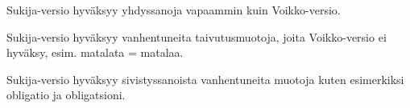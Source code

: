 \documentclass[12pt]{article}
\begin{document}
Sukija-versio hyväksyy yhdyssanoja vapaammin kuin Voikko-versio.

Sukija-versio hyväksyy vanhentuneita taivutusmuotoja, joita
Voikko-versio ei hyväksy, esim. matalata = matalaa.

Sukija-versio hyväksyy sivistyssanoista vanhentuneita muotoja kuten
esimerkiksi obligatio ja obligatsioni.



\end{document}
